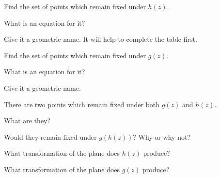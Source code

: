 \documentclass[../key.tex]{subfiles}
\begin{document}
\begin{outer_problem}
\item Find the set of points which remain fixed under $h(z)$.
\end{outer_problem}

\begin{inner_problem}[start=1]
\item What is an equation for it?
\end{inner_problem}

\begin{inner_problem}
\item Give it a geometric name. It will help to complete the table first.
\end{inner_problem}

\begin{outer_problem}
\item Find the set of points which remain fixed under $g(z)$.
\end{outer_problem}

\begin{inner_problem}[start=1]
\item What is an equation for it?
\end{inner_problem}

\begin{inner_problem}
\item Give it a geometric name.
\end{inner_problem}

\begin{outer_problem}
\item There are two points which remain fixed under both $g(z)$ and $h(z)$.
\end{outer_problem}

\begin{inner_problem}[start=1]
\item What are they?
\end{inner_problem}

\begin{inner_problem}
\item Would they remain fixed under $g(h(z))$? Why or why not?
\end{inner_problem}

\begin{outer_problem}
\item What transformation of the plane does $h(z)$ produce?
\end{outer_problem}

\begin{outer_problem}
\item What transformation of the plane does $g(z)$ produce?
\end{outer_problem}
\end{document}
